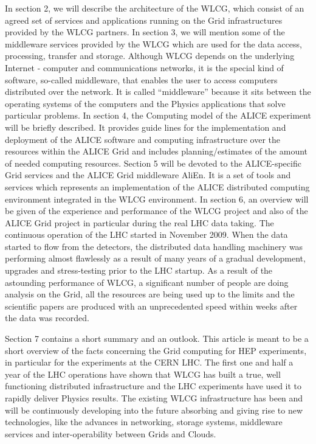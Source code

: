 \documentclass{intech}
\begin{document}
In section 2, we will describe the architecture of the WLCG, which
consist of an agreed set of services and applications running on the
Grid infrastructures provided by the WLCG partners. In section 3, we
will mention some of the middleware services provided by the WLCG
which are used for the data access, processing, transfer and
storage. Although WLCG depends on the underlying Internet - computer
and communications networks, it is the special kind of software, so-called
middleware, that enables the user to access computers
distributed over the network. It is called ``middleware'' because it
sits between the operating systems of the computers and the Physics
applications that solve particular problems. In section 4, the
Computing model of the ALICE experiment will be briefly described.
It provides guide lines for the implementation and deployment of the
ALICE software and computing infrastructure over the resources
within the ALICE Grid and includes planning/estimates of the amount
of needed computing resources. Section 5
will be devoted to the ALICE-specific Grid services and the ALICE
Grid middleware AliEn. It is a set of tools and services which
represents an implementation of the ALICE distributed computing
environment integrated in the WLCG environment.  In section 6, an
overview will be given of the experience and performance of the WLCG
project and also of the ALICE Grid project in particular during the
real LHC data taking. The continuous operation of the LHC started in
November 2009.  When the data started to flow from the detectors,
the distributed data handling machinery was performing almost
flawlessly as a result of many years of a gradual development,
upgrades and stress-testing prior to the LHC startup. As a result of
the astounding performance of WLCG, a significant number of people
are doing analysis on the Grid, all the resources are being used up
to the limits and the scientific papers are produced with an
unprecedented speed within weeks after the data was recorded.

Section 7 contains a short summary and an outlook. This article is
meant to be a short overview of the facts concerning the Grid
computing for HEP experiments, in particular for the experiments at
the CERN LHC. The first one and half a year of the LHC operations
have shown that WLCG has built a true, well functioning distributed
infrastructure and the LHC experiments have used it to rapidly
deliver Physics results. The existing WLCG infrastructure has been
and will be continuously developing into the future absorbing and
giving rise to new technologies, like the advances in networking,
storage systems, middleware services and inter-operability between
Grids and Clouds.
\end{document}
